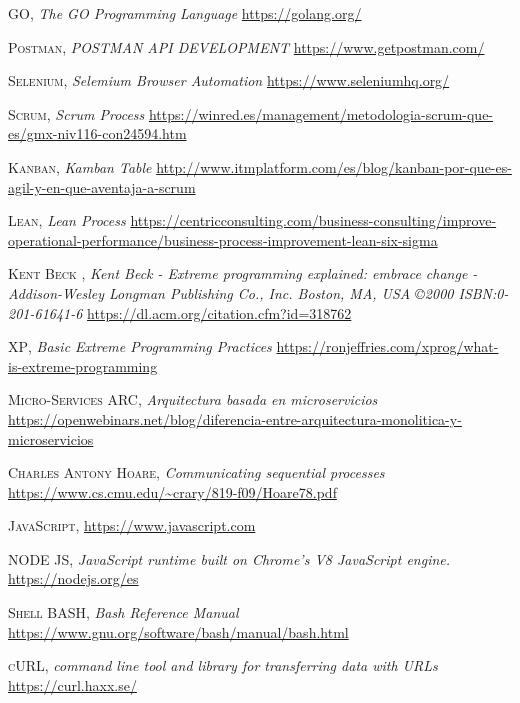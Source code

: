 \documentclass[a4paper,11pt]{book}
\begin{document}
 

\begin{thebibliography}{aaaa}


 \textsc{GO},
\textit{The GO Programming Language}
\url{https://golang.org/} 


 \textsc{Postman},
\textit{POSTMAN API DEVELOPMENT}
\url{https://www.getpostman.com/} 

 \textsc{Selenium},
\textit{Selemium Browser Automation}
\url{https://www.seleniumhq.org/} 

 \textsc{Scrum},
\textit{Scrum Process}
\url{https://winred.es/management/metodologia-scrum-que-es/gmx-niv116-con24594.htm} 

 \textsc{Kanban},
\textit{Kamban Table}
\url{http://www.itmplatform.com/es/blog/kanban-por-que-es-agil-y-en-que-aventaja-a-scrum} 

 \textsc{Lean},
\textit{Lean Process}
\url{https://centricconsulting.com/business-consulting/improve-operational-performance/business-process-improvement-lean-six-sigma} 

 \textsc{	Kent Beck	},
\textit{Kent Beck - Extreme programming explained: embrace change -Addison-Wesley Longman Publishing Co., Inc. Boston, MA, USA ©2000 ISBN:0-201-61641-6	}
\url{https://dl.acm.org/citation.cfm?id=318762} 

 \textsc{XP},
\textit{Basic Extreme Programming Practices}
\url{https://ronjeffries.com/xprog/what-is-extreme-programming} 


 \textsc{Micro-Services ARC},
\textit{Arquitectura basada en microservicios}
\url{https://openwebinars.net/blog/diferencia-entre-arquitectura-monolitica-y-microservicios} 

 \textsc{Charles Antony Hoare},
\textit{Communicating sequential processes}
\url{https://www.cs.cmu.edu/~crary/819-f09/Hoare78.pdf}

 \textsc{JavaScript},
\textit{}
\url{https://www.javascript.com}

 \textsc{NODE JS},
\textit{JavaScript runtime built on Chrome's V8 JavaScript engine.}
\url{https://nodejs.org/es}

 \textsc{Shell BASH},
\textit{Bash Reference Manual}
\url{https://www.gnu.org/software/bash/manual/bash.html}

 \textsc{cURL},
\textit{command line tool and library for transferring data with URLs}
\url{https://curl.haxx.se/}



\end{thebibliography}
\end{document}
